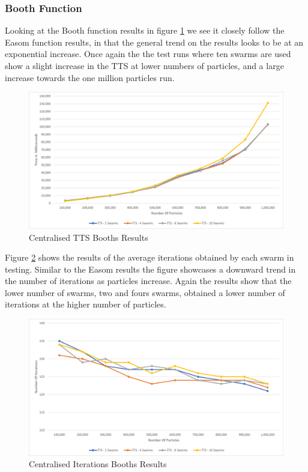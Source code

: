 \documentclass[oneside,12pt]{book}
\begin{document}
\subsubsection{Booth Function}
Looking at the Booth function results in figure \ref{fig:Centralised_TTS_Booths_Results} we see it closely follow the Easom function results, in that the general trend on the results looks to be at an exponential increase. Once again the the test runs where ten swarms are used show a slight increase in the TTS at lower numbers of particles, and a large increase towards the one million particles run.

\begin{figure}[H]
    \centering
    \includegraphics[scale=0.45]{Images/Graphs/CentralisedBoothsTTS.png}
    \caption{Centralised TTS Booths Results}
    \label{fig:Centralised_TTS_Booths_Results}
\end{figure}

Figure \ref{fig:Centralised_Epoc_Booths_Results} shows the results of the average iterations obtained by each swarm in testing. Similar to the Easom results the figure showcases a downward trend in the number of iterations as particles increase. Again the results show that the lower number of swarms, two and fours swarms, obtained a lower number of iterations at the higher number of particles. 

\begin{figure}[H]
    \centering
    \includegraphics[scale=0.45]{Images/Graphs/CentralisedBoothsEpoch.png}
    \caption{Centralised Iterations Booths Results}
    \label{fig:Centralised_Epoc_Booths_Results}
\end{figure}
\end{document}

